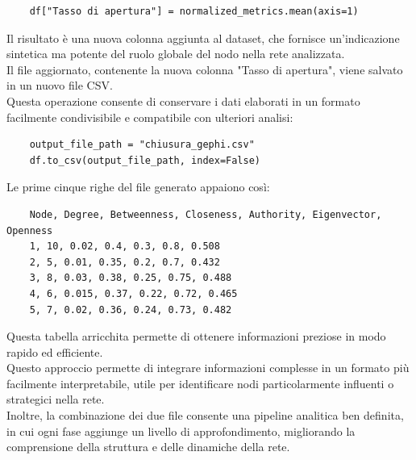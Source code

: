 \documentclass[12pt]{article}
\begin{document}
	\begin{lstlisting}
	df["Tasso di apertura"] = normalized_metrics.mean(axis=1)
	\end{lstlisting}
	Il risultato è una nuova colonna aggiunta al dataset, che fornisce un'indicazione sintetica ma potente del ruolo globale del nodo nella rete analizzata.\\
	Il file aggiornato, contenente la nuova colonna "Tasso di apertura", viene salvato in un nuovo file CSV. \\Questa operazione consente di conservare i dati elaborati in un formato facilmente condivisibile e compatibile con ulteriori analisi:
	\begin{lstlisting}
	output_file_path = "chiusura_gephi.csv"
	df.to_csv(output_file_path, index=False)
	\end{lstlisting}
	Le prime cinque righe del file generato appaiono così:
	\begin{lstlisting}
	Node, Degree, Betweenness, Closeness, Authority, Eigenvector, Openness
	1, 10, 0.02, 0.4, 0.3, 0.8, 0.508
	2, 5, 0.01, 0.35, 0.2, 0.7, 0.432
	3, 8, 0.03, 0.38, 0.25, 0.75, 0.488
	4, 6, 0.015, 0.37, 0.22, 0.72, 0.465
	5, 7, 0.02, 0.36, 0.24, 0.73, 0.482
	\end{lstlisting}
	Questa tabella arricchita permette di ottenere informazioni preziose in modo rapido ed efficiente.\\
	Questo approccio permette di integrare informazioni complesse in un formato più facilmente interpretabile, utile per identificare nodi particolarmente influenti o strategici nella rete. \\Inoltre, la combinazione dei due file consente una pipeline analitica ben definita, in cui ogni fase aggiunge un livello di approfondimento, migliorando la comprensione della struttura e delle dinamiche della rete.
\end{document}
